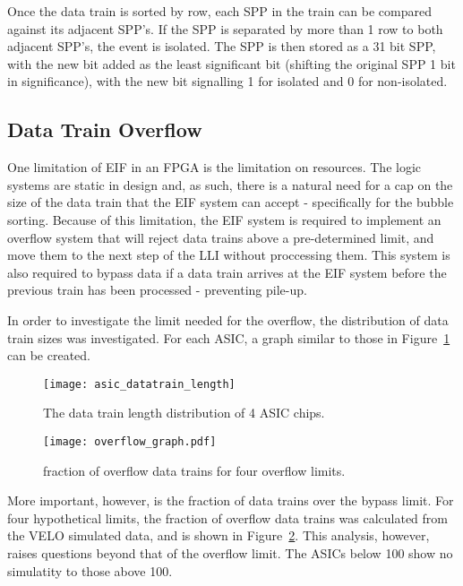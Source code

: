 		Once the data train is sorted by row, each SPP in the train can be compared against its adjacent SPP's.
		If the SPP is separated by more than 1 row to both adjacent SPP's, the event is isolated.
		The SPP is then stored as a 31 bit SPP, with the new bit added as the least significant bit (shifting the original SPP 1 bit in significance), with the new bit signalling 1 for isolated and 0 for non-isolated. 

	\subsection{Data Train Overflow} %
	\label{sub:data_train_overflow}
		
		One limitation of EIF in an FPGA is the limitation on resources. 
		The logic systems are static in design and, as such, there is a natural need for a cap on the size of the data train that the EIF system can accept - specifically for the bubble sorting.
		Because of this limitation, the EIF system is required to implement an overflow system that will reject data trains above a pre-determined limit, and move them to the next step of the LLI without proccessing them.
		This system is also required to bypass data if a data train arrives at the EIF system before the previous train has been processed - preventing pile-up.
		\par
		In order to investigate the limit needed for the overflow, the distribution of data train sizes was investigated. For each ASIC, a graph similar to those in Figure~\ref{fig:asic_datatrain} can be created.

		\begin{figure}[h]
			\centering
			\texttt{[image: asic\_datatrain\_length]}
			\caption{The data train length distribution of 4 ASIC chips.}
			\label{fig:asic_datatrain}
		\end{figure}
		\par
		\begin{figure}[h]
			\centering
			\texttt{[image: overflow\_graph.pdf]}
			\caption{fraction of overflow data trains for four overflow limits.}
			\label{fig:overflow_franction}
		\end{figure}\FloatBarrier
		More important, however, is the fraction of data trains over the bypass limit.
		For four hypothetical limits, the fraction of overflow data trains was calculated from the VELO simulated data, and is shown in Figure~\ref{fig:overflow_franction}.
		This analysis, however, raises questions beyond that of the overflow limit.
		The ASICs below 100 show no simulatity to those above 100.

